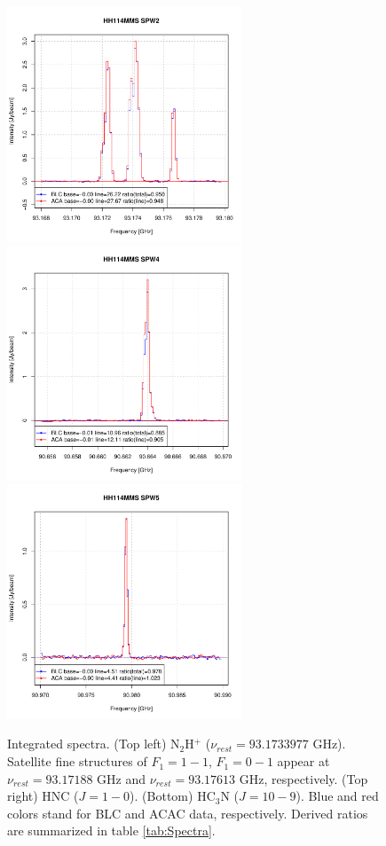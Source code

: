 \documentclass[a4paper, 10pt]{scrartcl}
\begin{document}
\begin{figure}[h]
	\centering
	\includegraphics[width=7cm]{HH114MMS.SPW2.pdf}\includegraphics[width=7cm]{HH114MMS.SPW4.pdf}
	\includegraphics[width=7cm]{HH114MMS.SPW5.pdf}
	\caption{Integrated spectra. (Top left) N$_2$H$^+$ ($\nu_{rest} = 93.1733977$ GHz). Satellite fine structures of $F_1= 1-1$, $F_1 = 0-1$ appear at $\nu_{rest} = 93.17188$ GHz and $\nu_{rest} = 93.17613$ GHz, respectively. (Top right) HNC ($J=1-0$). (Bottom) HC$_3$N ($J=10-9$). Blue and red colors stand for BLC and ACAC data, respectively. Derived ratios are summarized in table \ref{tab:Spectra}.}\label{fig:N2Hspec}
\end{figure}
\end{document}
